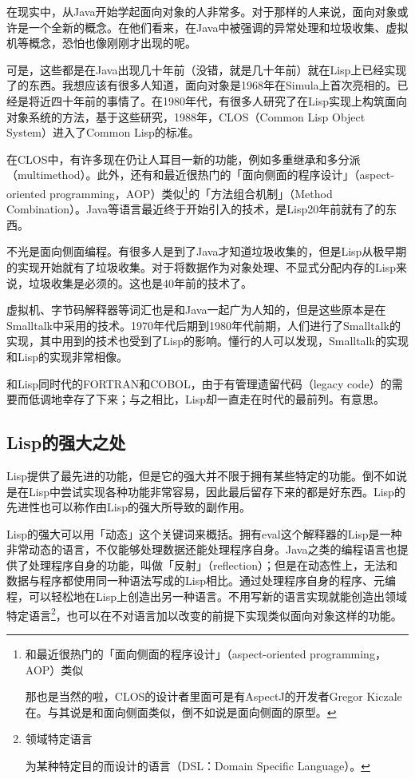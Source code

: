 \documentclass[a4paper,12pt]{article}
\begin{document}
在现实中，从Java开始学起面向对象的人非常多。对于那样的人来说，面向对象或许是一个全新的概念。在他们看来，在Java中被强调的异常处理和垃圾收集、虚拟机等概念，恐怕也像刚刚才出现的呢。

可是，这些都是在Java出现几十年前（没错，就是几十年前）就在Lisp上已经实现了的东西。我想应该有很多人知道，面向对象是1968年在Simula上首次亮相的。已经是将近四十年前的事情了。在1980年代，有很多人研究了在Lisp实现上构筑面向对象系统的方法，基于这些研究，1988年，CLOS（Common Lisp Object System）进入了Common Lisp的标准。

在CLOS中，有许多现在仍让人耳目一新的功能，例如多重继承和多分派（multimethod）。此外，还有和最近很热门的「面向侧面的程序设计」（aspect-oriented programming，AOP）类似\footnote{和最近很热门的「面向侧面的程序设计」（aspect-oriented programming，AOP）类似

那也是当然的啦，CLOS的设计者里面可是有AspectJ的开发者Gregor Kiczale在。与其说是和面向侧面类似，倒不如说是面向侧面的原型。}的「方法组合机制」（Method Combination）。Java等语言最近终于开始引入的技术，是Lisp20年前就有了的东西。

不光是面向侧面编程。有很多人是到了Java才知道垃圾收集的，但是Lisp从极早期的实现开始就有了垃圾收集。对于将数据作为对象处理、不显式分配内存的Lisp来说，垃圾收集是必须的。这也是40年前的技术了。

虚拟机、字节码解释器等词汇也是和Java一起广为人知的，但是这些原本是在Smalltalk中采用的技术。1970年代后期到1980年代前期，人们进行了Smalltalk的实现，其中用到的技术也受到了Lisp的影响。懂行的人可以发现，Smalltalk的实现和Lisp的实现非常相像。

和Lisp同时代的FORTRAN和COBOL，由于有管理遗留代码（legacy code）的需要而低调地幸存了下来；与之相比，Lisp却一直走在时代的最前列。有意思。

\subsection{Lisp的强大之处}

Lisp提供了最先进的功能，但是它的强大并不限于拥有某些特定的功能。倒不如说是在Lisp中尝试实现各种功能非常容易，因此最后留存下来的都是好东西。Lisp的先进性也可以称作由Lisp的强大所导致的副作用。

Lisp的强大可以用「动态」这个关键词来概括。拥有eval这个解释器的Lisp是一种非常动态的语言，不仅能够处理数据还能处理程序自身。Java之类的编程语言也提供了处理程序自身的功能，叫做「反射」（reflection）；但是在动态性上，无法和数据与程序都使用同一种语法写成的Lisp相比。通过处理程序自身的程序、元编程，可以轻松地在Lisp上创造出另一种语言。不用写新的语言实现就能创造出领域特定语言\footnote{领域特定语言

为某种特定目的而设计的语言（DSL：Domain Specific Language）。}，也可以在不对语言加以改变的前提下实现类似面向对象这样的功能。
\end{document}
